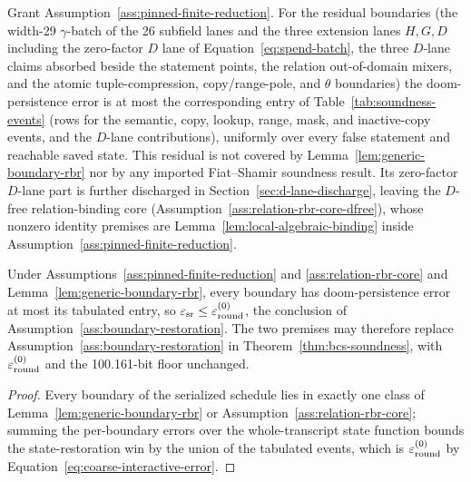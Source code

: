 \begin{assumption}
\label{ass:relation-rbr-core}
Grant Assumption~\ref{ass:pinned-finite-reduction}.  For the residual
boundaries (the width-29 \(\gamma\)-batch of the 26 subfield lanes and the
three extension lanes \(H,G,D\) including the zero-factor \(D\) lane of
Equation~\eqref{eq:spend-batch}, the three \(D\)-lane claims absorbed beside
the statement points, the relation out-of-domain mixers, and the atomic
tuple-compression, copy/range-pole, and \(\theta\) boundaries) the
doom-persistence error is at most the corresponding entry of
Table~\ref{tab:soundness-events} (rows for the semantic, copy, lookup, range,
mask, and inactive-copy events, and the \(D\)-lane contributions), uniformly
over every false statement and reachable saved state.  This residual is not
covered by Lemma~\ref{lem:generic-boundary-rbr} nor by any imported
Fiat--Shamir soundness result.  Its zero-factor \(D\)-lane part is further
discharged in Section~\ref{sec:d-lane-discharge}, leaving the \(D\)-free
relation-binding core (Assumption~\ref{ass:relation-rbr-core-dfree}), whose
nonzero identity premises are Lemma~\ref{lem:local-algebraic-binding} inside
Assumption~\ref{ass:pinned-finite-reduction}.
\end{assumption}

\begin{lemma}
\label{lem:boundary-restoration-reduction}
Under Assumptions~\ref{ass:pinned-finite-reduction} and
\ref{ass:relation-rbr-core} and Lemma~\ref{lem:generic-boundary-rbr}, every
boundary has doom-persistence error at most its tabulated entry, so
\(\varepsilon_{\rm sr}\le\varepsilon_{\rm round}^{(0)}\), the conclusion of
Assumption~\ref{ass:boundary-restoration}.  The two premises may therefore
replace Assumption~\ref{ass:boundary-restoration} in
Theorem~\ref{thm:bcs-soundness}, with \(\varepsilon_{\rm round}^{(0)}\) and the
100.161-bit floor unchanged.
\end{lemma}

\begin{proof}
Every boundary of the serialized schedule lies in exactly one class of
Lemma~\ref{lem:generic-boundary-rbr} or Assumption~\ref{ass:relation-rbr-core};
summing the per-boundary errors over the whole-transcript state function bounds
the state-restoration win by the union of the tabulated events, which is
\(\varepsilon_{\rm round}^{(0)}\) by
Equation~\eqref{eq:coarse-interactive-error}.
\end{proof}

